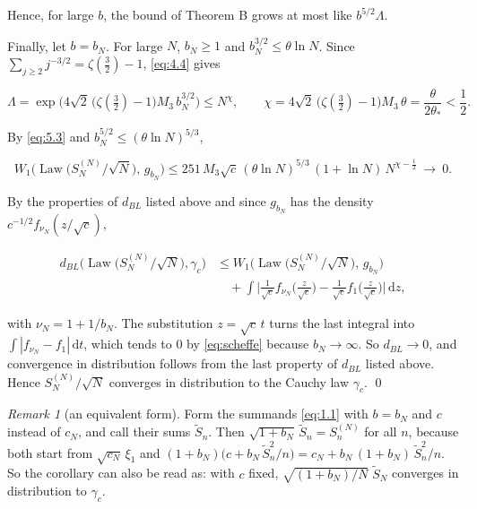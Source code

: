 \documentclass[aip,jmp,preprint,onecolumn,floatfix,superscriptaddress,nofootinbib,11pt]{revtex4-2}
\theoremstyle{plain}
\theoremstyle{remark}
\newtheorem*{remark}{Remark}
\numberwithin{equation}{section}
\newcommand{\dd}{\mathrm{d}}
\newcommand{\Law}{\operatorname{Law}}
\begin{document}
Hence, for large $b$, the bound of Theorem B grows at most like $b^{5/2}\Lambda$.

Finally, let $b=b_N$. For large $N$, $b_N\ge1$ and $b_N^{3/2}\le\theta\ln N$. Since $\sum_{j\ge2}j^{-3/2}=\zeta(\tfrac32)-1$, \eqref{eq:4.4} gives

\begin{equation*}
\Lambda=\exp\Big(4\sqrt2\,\big(\zeta(\tfrac32)-1\big)M_3\,b_N^{3/2}\Big)\le N^{\chi},\qquad \chi=4\sqrt2\,\big(\zeta(\tfrac32)-1\big)M_3\,\theta=\frac{\theta}{2\theta_*}<\frac12 .
\end{equation*}

By \eqref{eq:5.3} and $b_N^{5/2}\le(\theta\ln N)^{5/3}$,

\begin{equation*}
W_1\Big(\Law\big(S^{(N)}_N/\sqrt N\big),\,g_{b_N}\Big)\le251\,M_3\sqrt c\,(\theta\ln N)^{5/3}\,(1+\ln N)\,N^{\chi-\frac12}\ \longrightarrow\ 0 .
\end{equation*}

By the properties of $d_{BL}$ listed above and since $g_{b_N}$ has the density $c^{-1/2}f_{\nu_N}(z/\sqrt c)$,

\begin{equation*}
\begin{aligned} d_{BL}\Big(\Law\big(S^{(N)}_N/\sqrt N\big),\gamma_c\Big)&\le W_1\Big(\Law\big(S^{(N)}_N/\sqrt N\big),\,g_{b_N}\Big)\\[4pt] &\quad+\int\Big|\frac{1}{\sqrt c}f_{\nu_N}\Big(\frac{z}{\sqrt c}\Big)-\frac{1}{\sqrt c}f_1\Big(\frac{z}{\sqrt c}\Big)\Big|\,\dd z, \end{aligned}
\end{equation*}

with $\nu_N=1+1/b_N$. The substitution $z=\sqrt c\,t$ turns the last integral into $\int|f_{\nu_N}-f_1|\,\dd t$, which tends to $0$ by \eqref{eq:scheffe} because $b_N\to\infty$. So $d_{BL}\to0$, and convergence in distribution follows from the last property of $d_{BL}$ listed above. Hence $S^{(N)}_N/\sqrt N$ converges in distribution to the Cauchy law $\gamma_c$. \qed

\begin{remark}[an equivalent form]
Form the summands \eqref{eq:1.1} with $b=b_N$ and $c$ instead of $c_N$, and call their sums $\tilde S_n$. Then $\sqrt{1+b_N}\,\tilde S_n=S^{(N)}_n$ for all $n$, because both start from $\sqrt{c_N}\,\xi_1$ and $(1+b_N)\big(c+b_N\,\tilde S_n^{2}/n\big)=c_N+b_N\,(1+b_N)\,\tilde S_n^{2}/n$. So the corollary can also be read as: with $c$ fixed, $\sqrt{(1+b_N)/N}\;\tilde S_N$ converges in distribution to $\gamma_c$.
\end{remark}
\end{document}
